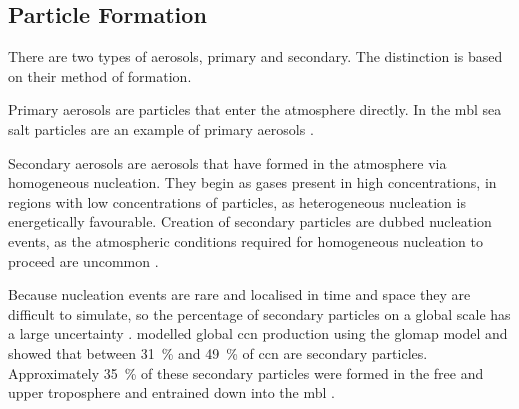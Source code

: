 

		\subsection{Particle Formation}

		There are two types of aerosols, primary and secondary. The distinction is based on their method of formation. 

		Primary aerosols are particles that enter the atmosphere directly. In the \gls{mbl} sea salt particles are an example of primary aerosols \citep{quinn:2011iv}.

		Secondary aerosols are aerosols that have formed in the atmosphere via homogeneous nucleation. They begin as gases present in high concentrations, in regions with low concentrations of particles, as heterogeneous nucleation is energetically favourable. Creation of secondary particles are dubbed nucleation events, as the atmospheric conditions required for homogeneous nucleation to proceed are uncommon \citep[Chapter 11]{seinfeld2012atmospheric}. 

		Because nucleation events are rare and localised in time and space they are difficult to simulate, so the percentage of secondary particles on a global scale has a large uncertainty \citep{intergovernmentalpanelonclimatechange:2015fa}. \citet{merikanto:2009iu} modelled global \gls{ccn} production using the \gls{glomap} model and showed that between \SI{31}{\percent} and \SI{49}{\percent} of \gls{ccn} are secondary particles. Approximately \SI{35}{\percent} of these secondary particles were formed in the free and upper troposphere and entrained down into the \gls{mbl} \citep{merikanto:2009iu}.




